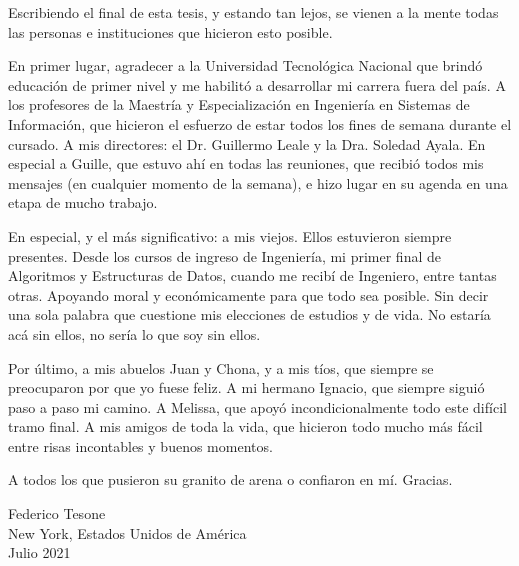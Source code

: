 \acknowledgements
Escribiendo el final de esta tesis, y estando tan lejos, se vienen a la mente todas las personas e instituciones que hicieron esto posible.

\bigskip En primer lugar, agradecer a la Universidad Tecnológica Nacional que brindó educación de primer nivel y me habilitó a desarrollar mi carrera fuera del país. A los profesores de la Maestría y Especialización en Ingeniería en Sistemas de Información, que hicieron el esfuerzo de estar todos los fines de semana durante el cursado. A mis directores: el Dr. Guillermo Leale y la Dra. Soledad Ayala. En especial a Guille, que estuvo ahí en todas las reuniones, que recibió todos mis mensajes (en cualquier momento de la semana), e hizo lugar en su agenda en una etapa de mucho trabajo.

\bigskip En especial, y el más significativo: a mis viejos. Ellos estuvieron siempre presentes. Desde los cursos de ingreso de Ingeniería, mi primer final de Algoritmos y Estructuras de Datos, cuando me recibí de Ingeniero, entre tantas otras. Apoyando moral y económicamente para que todo sea posible. Sin decir una sola palabra que cuestione mis elecciones de estudios y de vida. No estaría acá sin ellos, no sería lo que soy sin ellos.

\bigskip Por último, a mis abuelos Juan y Chona, y a mis tíos, que siempre se preocuparon por que yo fuese feliz. A mi hermano Ignacio, que siempre siguió paso a paso mi camino. A Melissa, que apoyó incondicionalmente todo este difícil tramo final. A mis amigos de toda la vida, que hicieron todo mucho más fácil entre risas incontables y buenos momentos.

\bigskip A todos los que pusieron su granito de arena o confiaron en mí. Gracias.

\vspace*{\fill}

\begin{flushright}
	Federico Tesone\\
	New York, Estados Unidos de América\\
	Julio 2021
\end{flushright}